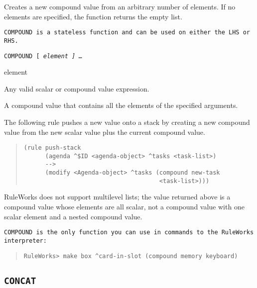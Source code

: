 Creates a new compound value from an arbitrary number of elements. If
no elements are specified, the function returns the empty list.

\tt{COMPOUND} is a stateless function and can be used on either the
LHS or RHS.

\Format

\tt{COMPOUND} [ \it{element} ] \ldots

\begin{arguments}
\item[element]

  Any valid scalar or compound value expression.
\end{arguments}

\ReturnValue

A compound value that contains all the elements of the
specified arguments.

\Example

The following rule pushes a new value onto a stack by creating a new
compound value from the new scalar value plus the current compound
value.

\begin{quote}
\begin{verbatim}
(rule push-stack
      (agenda ^$ID <agenda-object> ^tasks <task-list>)
      -->
      (modify <Agenda-object> ^tasks (compound new-task
                                      <task-list>)))
\end{verbatim}
\end{quote}

\begin{note}
  RuleWorks does not support multilevel lists; the value returned
  above is a compound value whose elements are all scalar, not a
  compound value with one scalar element and a nested compound value.
\end{note}

\tt{COMPOUND} is the only function you can use in commands to the
RuleWorks interpreter:

\begin{quote}
\begin{verbatim}
RuleWorks> make box ^card-in-slot (compound memory keyboard)
\end{verbatim}
\end{quote}

\subsection{\tt{CONCAT}}

